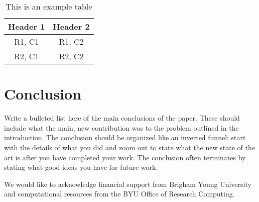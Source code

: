 \documentclass[journal=mamobx, layout=twocolumn]{achemso}
\begin{document}
\begin{table}
\caption{This is an example table}
\label{tab-example}
\begin{tabular}{cc}
\hline
Header 1 & Header 2 \\
\hline
R1, C1 & R1, C2 \\
R2, C1 & R2, C2 \\
\hline
\end{tabular}
\end{table}


\section{Conclusion}
Write a bulleted list here of the main conclusions of the paper.
These should include what the main, new contribution was to the problem outlined in the introduction.
The conclusion should be organized like an inverted funnel: start with the details of what you did and zoom out to state what the new state of the art is after you have completed your work.
The conclusion often terminates by stating what good ideas you have for future work.

\begin{acknowledgement}
We would like to acknowledge financial support from Brigham Young University and computational resources from the BYU Office of Research Computing.
\end{acknowledgement}

\clearpage

\end{document}
